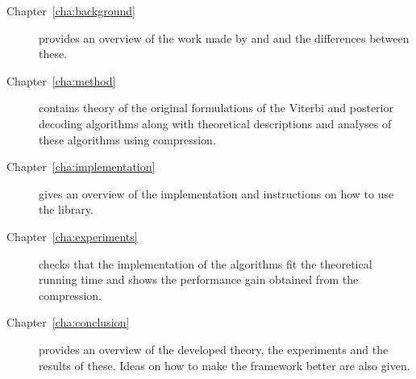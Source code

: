 \begin{description}
\item[Chapter~\ref{cha:background}] provides an overview of the work made by
  \citet{lifshits2009speeding} and \citet{sand2013ziphmmlib} and the differences
  between these.
\item[Chapter~\ref{cha:method}] contains theory of the original formulations
  of the Viterbi and posterior decoding algorithms along with theoretical
  descriptions and analyses of these algorithms using compression.
\item[Chapter~\ref{cha:implementation}] gives an overview of the implementation
  and instructions on how to use the library.
\item[Chapter~\ref{cha:experiments}] checks that the implementation of the
  algorithms fit the theoretical running time and shows the performance gain
  obtained from the compression.
\item[Chapter~\ref{cha:conclusion}] provides an overview of the developed
  theory, the experiments and the results of these. Ideas on how to
  make the framework better are also given.
\end{description}

